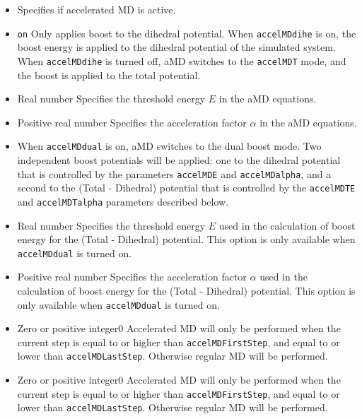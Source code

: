 \begin{itemize}

\item
{}
{Specifies if accelerated MD is active.}

\item
{} {{\tt on}} 
{Only applies boost to the dihedral potential. 
When {\tt accelMDdihe} is on, the boost energy is applied to the dihedral potential of the simulated system.
When {\tt accelMDdihe} is turned off, aMD switches to the {\tt accelMDT} mode, and the boost is applied to the total potential.
}

\item
{}
{Real number}
{Specifies the threshold energy $E$ in the aMD equations. 
}

\item
{}
{Positive real number}
{Specifies the acceleration factor $\alpha$ in the aMD equations. 
}

\item
{}
{When {\tt accelMDdual} is on, aMD switches to the dual boost mode. Two independent boost potentials 
will be applied: one to the dihedral potential that is controlled by the parameters {\tt accelMDE} and {\tt accelMDalpha},
and a second to the (Total - Dihedral) potential that is controlled by the  {\tt accelMDTE} and {\tt accelMDTalpha} parameters described below.
}

\item
{}
{Real number}
{Specifies the threshold energy $E$ used in the calculation of boost energy for the (Total - Dihedral) potential. 
This option is only available when {\tt accelMDdual} is turned on.
}

\item
{}
{Positive real number}
{Specifies the acceleration factor $\alpha$ used in the calculation of boost energy for the (Total - Dihedral) potential. 
This option is only available when {\tt accelMDdual} is turned on.
}

\item
{}
{Zero or positive integer}{0}
{Accelerated MD will only be performed when the current step is equal to or higher than {\tt accelMDFirstStep}, and equal to or lower than {\tt accelMDLastStep}. Otherwise regular MD will be performed.
}
\item
{}
{Zero or positive integer}{0}
{Accelerated MD will only be performed when the current step is equal to or higher than {\tt accelMDFirstStep}, and equal to or lower than {\tt accelMDLastStep}. Otherwise regular MD will be performed.
}


\end{itemize}
